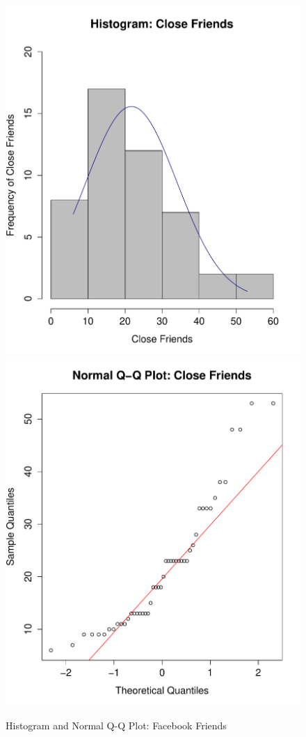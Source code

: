 \begin{figure}[H]
\caption{Histogram and Normal Q-Q Plot: Facebook Friends}
\centering
\includegraphics[scale=0.35]{./img/hist_closefriends.pdf}
\includegraphics[scale=0.35]{./img/qqplot_closefriends.pdf}
\end{figure}

